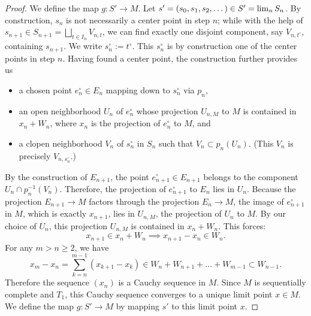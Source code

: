\documentclass[11pt]{amsart}
\newcommand{\eq}[2]{\begin{equation}\label{#1}#2 \end{equation}}
\newcommand{\ra}{\rightarrow} %
\renewcommand{\lim}{\operatornamewithlimits{\rm{lim}}}
\theoremstyle{plain}
\theoremstyle{definition}
\numberwithin{equation}{prop}
\begin{document}
\begin{proof}
We define the map $g:S'\ra M$.
Let $s'=(s_0, s_1, s_2, \dots)\in S' = \lim_n S_n$.
By construction, $s_n$ is not necessarily a center point in  step $n$;
while with the help of $s_{n+1} \in S_{n+1} =
\bigsqcup_{t \in I_n} V_{n,t}$, 
we can find exactly one disjoint component, say 
$V_{n,t^\circ}$,  
containing $s_{n+1}$.
We write $s_n^\circ:=t^\circ.$
This $s_n^{\circ}$ is by construction one of the center points in step $n$.
Having found a center point, the construction further provides us
\begin{itemize}
\item 
a chosen point $e_n^{\circ}\in E_n$ mapping down to $s_n^{\circ}$ via $p_n$,
\item 
an open neighborhood $U_n$ of $e_n^{\circ}$ whose projection $U_{n,M}$ to $M$ is contained in  $x_n+W_n$, where $x_n$ is the projection of $e_n^\circ$ to $M$, and 
\item 
a clopen neighborhood $V_n$ of $s_n^\circ$ in $S_n$ such that $V_{n}\subset p_n(U_n)$.
(This $V_n$ is precisely $V_{n,s_n^\circ}$.)
\end{itemize} 
By the construction of $E_{n+1}$, the point $e^{\circ}_{{n+1}} \in E_{n+1}$ belongs to the component $U_{n} \cap p_n^{-1}(V_{n})$. 
Therefore, the projection of $e_{n+1}^\circ$ to $E_n$ lies in $U_{n}$.  
Because the projection $E_{n+1}\ra M$ factors through the projection $E_n\ra M$, the image of $e_{n+1}^\circ$ in $M$, which is exactly $x_{n+1}$, lies in $U_{n,M}$, the projection of $U_{n}$ to $M$. 
By our choice of $U_{n}$, this projection $U_{n,M}$ is contained in $x_n + W_n$.
This forces:
$$x_{n+1} \in x_n + W_n \implies x_{n+1} - x_n \in W_n.$$
For any $m > n \ge 2$, we have 
\eq{ColimCok_Cauchy}{x_m - x_n = \sum_{k=n}^{m-1} (x_{k+1} - x_k) \in W_n + W_{n+1} + \dots + W_{m-1} \subset W_{n-1}.}
Therefore the sequence $(x_n)$  is a Cauchy sequence in $M$. 
Since $M$ is sequentially complete and $T_1$, this Cauchy sequence converges to a unique limit point $x \in M$. 
We define the map $g:S'\ra M$ by mapping $s'$ to this limit point $x$.

























\end{proof}
\end{document}
